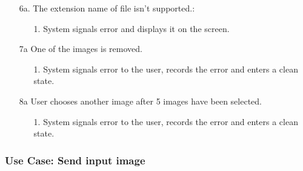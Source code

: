 \documentclass[parskip=full]{scrartcl}
\begin{document}
\begin{enumerate}
\begin{itemize} [nosep]
		\item[6a.] The extension name of file isn't supported.:
		\begin{itemize} [nosep]
			\item[1.] System signals error and displays it on the screen.
		\end{itemize}
		\item[7a] One of the images is removed.
		\begin{itemize} [nosep]
			\item[1.] System signals error to the user, records the error and enters a clean state.
		\end{itemize}		
		\item[8a] User chooses another image after 5 images have been selected.
		\begin{itemize} [nosep]
			\item[1.] System signals error to the user, records the error and enters a clean state.
		\end{itemize}		
	\end{itemize}
\end{enumerate}

\pagebreak


\subsubsection {Use Case: Send input image} \label {uc:sip}
\end{document}
